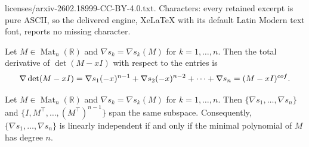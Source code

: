 \documentclass[10pt,a4paper]{amsart}
\newcommand{\cof}{^{\rm cof}}
\newcommand{\mat}[1][n]{\operatorname{Mat}_{#1}(\mathbb{R})}
\newcommand{\trans}{^\top}
\begin{document}
licenses/arxiv-2602.18999-CC-BY-4.0.txt. Characters: every retained excerpt is pure ASCII, so the delivered engine, XeLaTeX with its default Latin Modern text font, reports no missing character.
\begin{proposition}
\label{prop:gradientadj}
Let $M\in\mat$ and $\nabla s_k = \nabla s_k(M)$ for $k = 1, \ldots, n$.  Then the total derivative of $\det(M - xI)$ with respect to the entries is 
\[
    \nabla\det(M - xI) = \nabla s_1(-x)^{n-1} + \nabla s_2(-x)^{n-2} + \cdots + \nabla s_n = (M - xI)\cof.
\] 
\end{proposition}

\begin{lemma}
\label{lem:gradientind}
Let $M\in\mat$ and $\nabla s_k = \nabla s_k(M)$ for $k = 1, \ldots, n$.  Then $
\{\nabla s_1, \ldots, \nabla s_n\}$ and $\{I, M\trans, \ldots, (M\trans)^{n-1}\}$ span the same subspace.  Consequently, $
\{\nabla s_1, \ldots, \nabla s_n\}$ is linearly independent if and only if the minimal polynomial of $M$ has degree $n$.  
\end{lemma}
\end{document}
